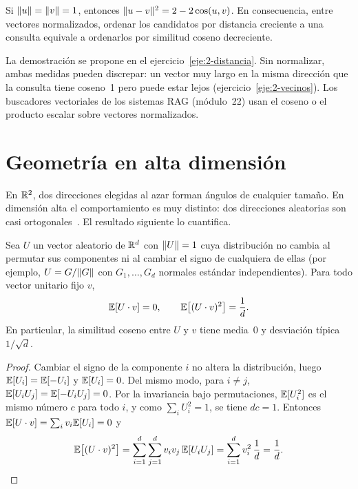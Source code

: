 \begin{proposicion}\label{prop:coseno-distancia}
Si $\lVert u\rVert=\lVert v\rVert=1$, entonces $\lVert u-v\rVert^{2}=2-2\cos(u,v)$. En consecuencia, entre vectores normalizados, ordenar los candidatos por distancia creciente a una consulta equivale a ordenarlos por similitud coseno decreciente.
\end{proposicion}

La demostración se propone en el ejercicio~\ref{eje:2-distancia}. Sin normalizar, ambas medidas pueden discrepar: un vector muy largo en la misma dirección que la consulta tiene coseno~1 pero puede estar lejos (ejercicio~\ref{eje:2-vecinos}). Los buscadores vectoriales de los sistemas RAG (módulo~22) usan el coseno o el producto escalar sobre vectores normalizados.

\section{Geometría en alta dimensión}

En $\mathbb{R}^{2}$, dos direcciones elegidas al azar forman ángulos de cualquier tamaño. En dimensión alta el comportamiento es muy distinto: dos direcciones aleatorias son casi ortogonales~\cite[§2.4.2]{bhk}. El resultado siguiente lo cuantifica.

\begin{proposicion}\label{prop:alta-dim}
Sea $U$ un vector aleatorio de $\mathbb{R}^{d}$ con $\lVert U\rVert=1$ cuya distribución no cambia al permutar sus componentes ni al cambiar el signo de cualquiera de ellas (por ejemplo, $U=G/\lVert G\rVert$ con $G_1,\dots,G_d$ normales estándar independientes). Para todo vector unitario fijo $v$,
\[
\mathbb{E}[U\cdot v]=0,\qquad \mathbb{E}\bigl[(U\cdot v)^{2}\bigr]=\frac1d .
\]
En particular, la similitud coseno entre $U$ y $v$ tiene media~0 y desviación típica $1/\sqrt d$.
\end{proposicion}

\begin{proof}
Cambiar el signo de la componente $i$ no altera la distribución, luego $\mathbb{E}[U_i]=\mathbb{E}[-U_i]$ y $\mathbb{E}[U_i]=0$. Del mismo modo, para $i\neq j$, $\mathbb{E}[U_iU_j]=\mathbb{E}[-U_iU_j]=0$. Por la invariancia bajo permutaciones, $\mathbb{E}[U_i^{2}]$ es el mismo número $c$ para todo $i$, y como $\sum_iU_i^{2}=1$, se tiene $dc=1$. Entonces $\mathbb{E}[U\cdot v]=\sum_iv_i\mathbb{E}[U_i]=0$ y
\[
\mathbb{E}\bigl[(U\cdot v)^{2}\bigr]=\sum_{i=1}^{d}\sum_{j=1}^{d}v_iv_j\,\mathbb{E}[U_iU_j]=\sum_{i=1}^{d}v_i^{2}\,\frac1d=\frac1d. \qedhere
\]
\end{proof}

